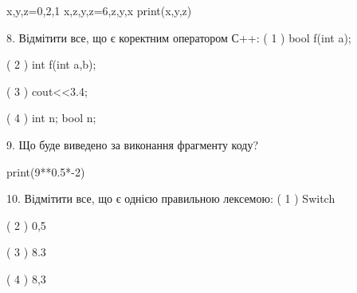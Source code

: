 \documentclass[11pt]{article}
\begin{document}
x,y,z=0,2,1
x,z,y,z=6,z,y,x
print(x,y,z)
\vspace{5mm}

8. %
Відмітити все, що є коректним оператором С++:
( 1 ) bool f(int a);

( 2 ) int f(int a,b);

( 3 ) cout<<3.4;

( 4 ) int n; bool n;
\vspace{5mm}

9. Що буде виведено за виконання фрагменту коду?

print(9**0.5*-2)
\vspace{5mm}

10. %
Відмітити все, що є однією правильною лексемою:
( 1 ) Switch

( 2 ) 0,5

( 3 ) 8.3

( 4 ) 8,3
\vspace{5mm}

\newpage
\end{document}

